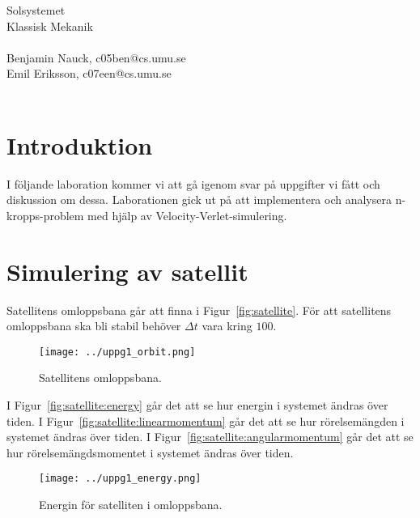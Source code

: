 \documentclass[a4]{article}
\begin{document}
{
\Large
Solsystemet\\
Klassisk Mekanik\\
~\\
Benjamin Nauck, c05ben@cs.umu.se\\
Emil Eriksson, c07een@cs.umu.se\\
~\\
}
\clearpage

\section{Introduktion}
I följande laboration kommer vi att gå igenom svar på uppgifter vi fått och
diskussion om dessa.
Laborationen gick ut på att implementera och analysera n-kropps-problem med
hjälp av Velocity-Verlet-simulering.

\section{Simulering av satellit}
Satellitens omloppsbana går att finna i Figur~\vref{fig:satellite}.
För att satellitens omloppsbana ska bli stabil behöver $\Delta t$ vara kring
$100$.
\begin{figure}
\begin{center}
	\texttt{[image: ../uppg1\_orbit.png]}
\end{center}
\caption{Satellitens omloppsbana.}
\label{fig:satellite}
\end{figure}


I Figur~\vref{fig:satellite:energy} går det att se hur energin i systemet ändras
över tiden.
I Figur~\vref{fig:satellite:linearmomentum} går det att se hur rörelsemängden i
systemet ändras över tiden.
I Figur~\vref{fig:satellite:angularmomentum} går det att se hur
rörelsemängdsmomentet i systemet ändras över tiden.

\begin{figure}
\begin{center}
	\texttt{[image: ../uppg1\_energy.png]}
\end{center}
\caption{Energin för satelliten i omloppsbana.}
\label{fig:satellite:energy}
\end{figure}
\end{document}
